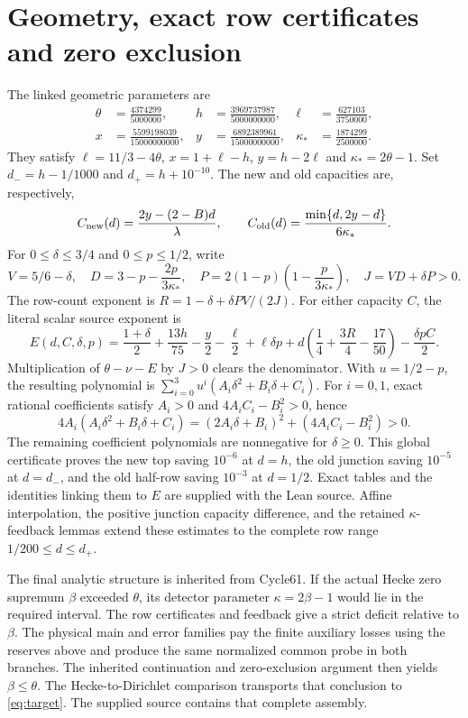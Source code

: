 \documentclass[10pt]{article}
\begin{document}
\section{Geometry, exact row certificates and zero exclusion}
The linked geometric parameters are
\begin{align*}
 \theta&=\frac{4374299}{5000000},&
 h&=\frac{3969737987}{5000000000},&
 \ell&=\frac{627103}{3750000},\\
 x&=\frac{5599198039}{15000000000},&
 y&=\frac{6892389961}{15000000000},&
 \kappa_*&=\frac{1874299}{2500000}.
\end{align*}
They satisfy $\ell=11/3-4\theta$, $x=1+\ell-h$, $y=h-2\ell$ and
$\kappa_*=2\theta-1$. Set $d_-=h-1/1000$ and $d_+=h+10^{-10}$.
The new and old capacities are, respectively,
\[
 C_{\rm new}(d)=\frac{2y-(2-B)d}{\lambda},\qquad
 C_{\rm old}(d)=\frac{\min\{d,2y-d\}}{6\kappa_*}.
\]
For $0\le\delta\le3/4$ and $0\le p\le1/2$, write
\[
 V=5/6-\delta,\quad D=3-p-\frac{2p}{3\kappa_*},\quad
 P=2(1-p)\left(1-\frac p{3\kappa_*}\right),\quad J=VD+\delta P>0.
\]
The row-count exponent is $R=1-\delta+\delta PV/(2J)$.
For either capacity $C$, the literal scalar source exponent is
\[
 E(d,C,\delta,p)=\frac{1+\delta}{2}+\frac{13h}{75}-\frac y2-\frac\ell2
 +\ell\delta p+d\left(\frac14+\frac{3R}{4}-\frac{17}{50}\right)
 -\frac{\delta p C}{2}.
\]
Multiplication of $\theta-\nu-E$ by $J>0$ clears the denominator.
With $u=1/2-p$, the resulting polynomial is
$\sum_{i=0}^3u^i(A_i\delta^2+B_i\delta+C_i)$.
For $i=0,1$, exact rational coefficients satisfy $A_i>0$ and
$4A_iC_i-B_i^2>0$, hence
\[
 4A_i(A_i\delta^2+B_i\delta+C_i)
 =(2A_i\delta+B_i)^2+(4A_iC_i-B_i^2)>0.
\]
The remaining coefficient polynomials are nonnegative for $\delta\ge0$.
This global certificate proves the new top saving $10^{-6}$ at $d=h$,
the old junction saving $10^{-5}$ at $d=d_-$, and the old half-row saving
$10^{-3}$ at $d=1/2$. Exact tables and the identities linking them to
$E$ are supplied with the Lean source. Affine interpolation, the positive
junction capacity difference, and the retained $\kappa$-feedback lemmas extend
these estimates to the complete row range $1/200\le d\le d_+$.

The final analytic structure is inherited from Cycle61. If the actual Hecke
zero supremum $\beta$ exceeded $\theta$, its detector parameter
$\kappa=2\beta-1$ would lie in the required interval. The row certificates
and feedback give a strict deficit relative to $\beta$. The physical main and
error families pay the finite auxiliary losses using the reserves above and
produce the same normalized common probe in both branches. The inherited
continuation and zero-exclusion argument then yields $\beta\le\theta$.
The Hecke-to-Dirichlet comparison transports that conclusion to
\eqref{eq:target}. The supplied source contains that complete assembly.
\end{document}
